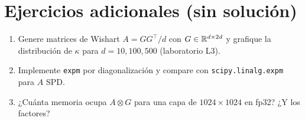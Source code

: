\documentclass[11pt,a4paper]{article}
\begin{document}
\section{Ejercicios adicionales (sin solución)}
\begin{enumerate}[label=\textbf{P\arabic*.}]
\item Genere matrices de Wishart $A=GG^\top/d$ con $G\in\mathbb{R}^{d\times2d}$ y grafique la distribución de $\kappa$ para $d=10,100,500$ (laboratorio L3).
\item Implemente \texttt{expm} por diagonalización y compare con \texttt{scipy.linalg.expm} para $A$ SPD.
\item ¿Cuánta memoria ocupa $A\otimes G$ para una capa de $1024\times1024$ en fp32? ¿Y los factores?
\end{enumerate}
\end{document}
